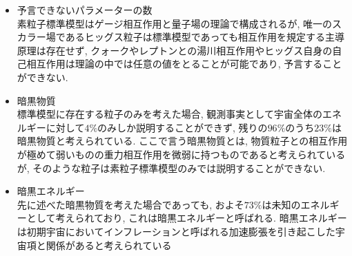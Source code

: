 \begin{itemize}
      \item 予言できないパラメーターの数\\
            素粒子標準模型はゲージ相互作用と量子場の理論で構成されるが, 唯一のスカラー場であるヒッグス粒子は標準模型であっても相互作用を規定する主導原理は存在せず, クォークやレプトンとの湯川相互作用やヒッグス自身の自己相互作用は理論の中では任意の値をとることが可能であり, 予言することができない.
      \item 暗黒物質\\
            標準模型に存在する粒子のみを考えた場合, 観測事実として宇宙全体のエネルギーに対して$4\%$のみしか説明することができず, 残りの$96\%$のうち$23\%$は暗黒物質と考えられている.
	    ここで言う暗黒物質とは, 物質粒子との相互作用が極めて弱いものの重力相互作用を微弱に持つものであると考えられているが, そのような粒子は素粒子標準模型のみでは説明することができない.
      \item 暗黒エネルギー\\
            先に述べた暗黒物質を考えた場合であっても, およそ$73\%$は未知のエネルギーとして考えられており, これは暗黒エネルギーと呼ばれる.
	    暗黒エネルギーは初期宇宙においてインフレーションと呼ばれる加速膨張を引き起こした宇宙項と関係があると考えられている
\end{itemize}

